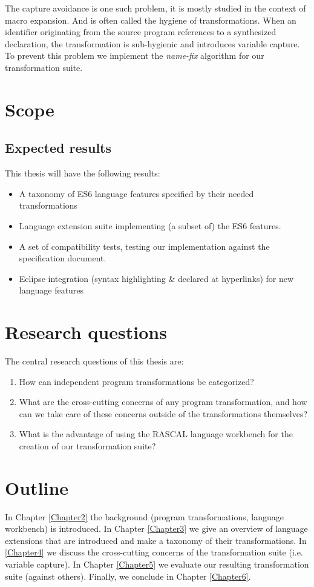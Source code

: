 The capture avoidance is one such problem, it is mostly studied in the context of macro expansion\cite{Herman2010a,Herman2010,Disney2014}. And is often called the hygiene of transformations. When an identifier originating from the source program references to a synthesized declaration, the transformation is sub-hygienic and introduces variable capture. To prevent this problem we implement the \textit{name-fix} algorithm\cite{Erdweg2014} for our transformation suite.

\section{Scope}

\subsection{Expected results}
This thesis will have the following results:
\begin{itemize}
	\item A taxonomy of ES6 language features specified by their needed transformations
	\item Language extension suite implementing (a subset of) the ES6 features.
	\item A set of compatibility tests, testing our implementation against the specification document.
	\item Eclipse integration (syntax highlighting \& declared at hyperlinks) for new language features
\end{itemize}
\section{Research questions}
The central research questions of this thesis are:

\begin{enumerate}
	\item How can independent program transformations be categorized?
	\item What are the cross-cutting concerns of any program transformation, and how can we take care of these concerns outside of the transformations themselves?
	\item What is the advantage of using the RASCAL language workbench\cite{Klint} for the creation of our transformation suite?
\end{enumerate}

\section{Outline}
In Chapter \ref{Chapter2} the background (program transformations, language workbench) is introduced. In Chapter \ref{Chapter3} we give an overview of language extensions that are introduced and make a taxonomy of their transformations. In \ref{Chapter4} we discuss the cross-cutting concerns of the transformation suite (i.e. variable capture). In Chapter \ref{Chapter5} we evaluate our resulting transformation suite (against others). Finally, we conclude in Chapter \ref{Chapter6}.